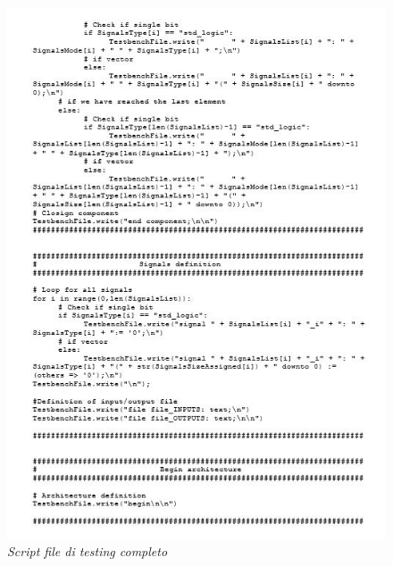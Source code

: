 \begin{figure}[!htb]
	\centering
	\includegraphics[scale=1.2]{immagini/tbgen4}
	\caption{\textit{Script file di testing completo}}
	\label{tbgen4}
\end{figure}
